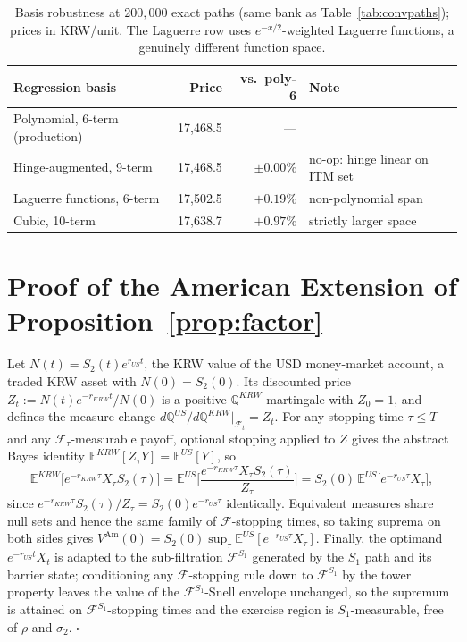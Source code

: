 \documentclass[11pt,a4paper]{article}
\begin{document}
\begin{table}[h]
\centering
\footnotesize
\begin{tabular}{lrrl}
\toprule
Regression basis & Price & vs.\ poly-6 & Note \\
\midrule
Polynomial, 6-term (production) & 17{,}468.5 &---& \\
Hinge-augmented, 9-term & 17{,}468.5 & $\pm0.00\%$ & no-op: hinge linear on ITM set \\
Laguerre functions, 6-term & 17{,}502.5 & $+0.19\%$ & non-polynomial span \\
Cubic, 10-term & 17{,}638.7 & $+0.97\%$ & strictly larger space \\
\bottomrule
\end{tabular}
\caption{Basis robustness at $200{,}000$ exact paths (same bank as Table~\ref{tab:convpaths}); prices in KRW/unit. The Laguerre row uses $e^{-x/2}$-weighted Laguerre functions, a genuinely different function space.}
\label{tab:basis}
\end{table}

\section{Proof of the American Extension of Proposition~\ref{prop:factor}}
\label{app:amproof}

Let $N(t)=S_2(t)e^{r_{US}t}$, the KRW value of the USD money-market account, a traded KRW asset with $N(0)=S_2(0)$. Its discounted price $Z_t:=N(t)e^{-r_{KRW}t}/N(0)$ is a positive $\mathbb Q^{KRW}$-martingale with $Z_0=1$, and defines the measure change $d\mathbb Q^{US}/d\mathbb Q^{KRW}\big|_{\mathcal F_t}=Z_t$. For any stopping time $\tau\le T$ and any $\mathcal F_\tau$-measurable payoff, optional stopping applied to $Z$ gives the abstract Bayes identity $\mathbb E^{KRW}[Z_\tau Y]=\mathbb E^{US}[Y]$, so
\[
\mathbb E^{KRW}\!\big[e^{-r_{KRW}\tau}X_\tau S_2(\tau)\big]
=\mathbb E^{US}\!\Big[\frac{e^{-r_{KRW}\tau}X_\tau S_2(\tau)}{Z_\tau}\Big]
= S_2(0)\,\mathbb E^{US}\!\big[e^{-r_{US}\tau}X_\tau\big],
\]
since $e^{-r_{KRW}\tau}S_2(\tau)/Z_\tau = S_2(0)e^{-r_{US}\tau}$ identically. Equivalent measures share null sets and hence the same family of $\mathcal F$-stopping times, so taking suprema on both sides gives $V^{\mathrm{Am}}(0)=S_2(0)\sup_\tau\mathbb E^{US}[e^{-r_{US}\tau}X_\tau]$. Finally, the optimand $e^{-r_{US}t}X_t$ is adapted to the sub-filtration $\mathcal F^{S_1}$ generated by the $S_1$ path and its barrier state; conditioning any $\mathcal F$-stopping rule down to $\mathcal F^{S_1}$ by the tower property leaves the value of the $\mathcal F^{S_1}$-Snell envelope unchanged, so the supremum is attained on $\mathcal F^{S_1}$-stopping times and the exercise region is $S_1$-measurable, free of $\rho$ and $\sigma_2$. $\square$
\end{document}
